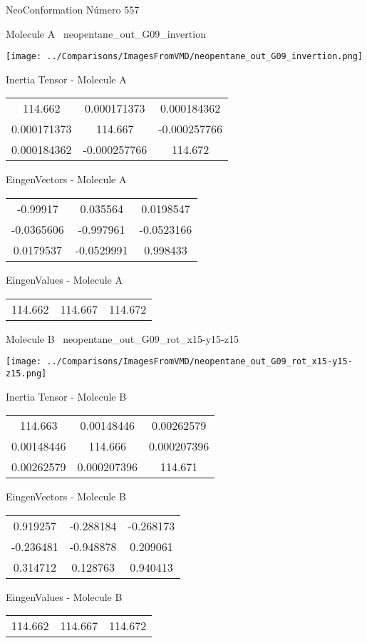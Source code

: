 \vtab[-3cm]
\begin{center}
{\large NeoConformation \tab Número 557}
\end{center}
\begin{multicols}{2}
\begin{center}

Molecule A \
neopentane\_out\_G09\_invertion

\texttt{[image: ../Comparisons/ImagesFromVMD/neopentane\_out\_G09\_invertion.png]}

Inertia Tensor - Molecule A \\
\begin{tabular}{|c c c|}
114.662	 & 	0.000171373	 & 	0.000184362	 \\
0.000171373	 & 	114.667	 & 	-0.000257766	 \\
0.000184362	 & 	-0.000257766	 & 	114.672
\end{tabular}

\vtab
 EingenVectors - Molecule A     \\
\begin{tabular}{|c c c|}
-0.99917	 & 	0.035564	 & 	0.0198547	 \\
-0.0365606	 & 	-0.997961	 & 	-0.0523166	 \\
0.0179537	 & 	-0.0529991	 & 	0.998433
\end{tabular}

\vtab
 EingenValues - Molecule A     \\
\begin{tabular}{|c c c|}
114.662	 & 	114.667	 & 	114.672	 \\
\end{tabular}
\columnbreak

Molecule B \
neopentane\_out\_G09\_rot\_x15-y15-z15

\texttt{[image: ../Comparisons/ImagesFromVMD/neopentane\_out\_G09\_rot\_x15-y15-z15.png]}

Inertia Tensor - Molecule B \\
\begin{tabular}{|c c c|}
114.663	 & 	0.00148446	 & 	0.00262579	 \\
0.00148446	 & 	114.666	 & 	0.000207396	 \\
0.00262579	 & 	0.000207396	 & 	114.671
\end{tabular}

\vtab
 EingenVectors - Molecule B     \\
\begin{tabular}{|c c c|}
0.919257	 & 	-0.288184	 & 	-0.268173	 \\
-0.236481	 & 	-0.948878	 & 	0.209061	 \\
0.314712	 & 	0.128763	 & 	0.940413
\end{tabular}

\vtab
 EingenValues - Molecule B     \\
\begin{tabular}{|c c c|}
114.662	 & 	114.667	 & 	114.672	 \\
\end{tabular}

\end{center}
\end{multicols}

